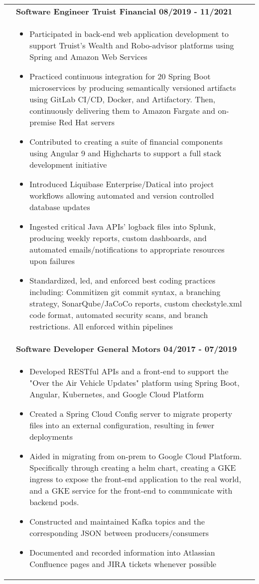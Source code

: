 \documentclass[final]{letter}
\begin{document}
\begin{tabularx}{\linewidth}{
		>{\raggedright\bf\Large} p{8.5em}X
		>{}X
	}
		
		& \quad\large\bf{Software Engineer \hfill {Truist Financial} \hfill 08/2019 - 11/2021} \\
		& \begin{itemize}[topsep=1pt,noitemsep]
			\item Participated in back-end web application development to support Truist's Wealth and Robo-advisor platforms using Spring and Amazon Web Services
			\item Practiced continuous integration for 20 Spring Boot microservices by producing semantically versioned artifacts using GitLab CI/CD, Docker, and Artifactory. Then, continuously delivering them to Amazon Fargate and on-premise Red Hat servers 
			\item Contributed to creating a suite of financial components using Angular 9 and Highcharts to support a full stack development initiative
			\item Introduced Liquibase Enterprise/Datical into project workflows allowing automated and version controlled database updates
			\item Ingested critical Java APIs' logback files into Splunk, producing weekly reports, custom dashboards, and automated emails/notifications to appropriate resources upon failures
			\item Standardized, led, and enforced best coding practices including: Commitizen git commit syntax, a branching strategy, SonarQube/JaCoCo reports, custom checkstyle.xml code format, automated security scans, and branch restrictions. All enforced within pipelines
		\end{itemize} \\
			
		& \large\bf{Software Developer \hfill {General Motors} \hfill 04/2017 - 07/2019} \\
		& \begin{itemize}[topsep=1pt,noitemsep]
			\item Developed RESTful APIs and a front-end to support the "Over the Air Vehicle Updates" platform using Spring Boot, Angular, Kubernetes, and Google Cloud Platform
			\item Created a Spring Cloud Config server to migrate property files into an external configuration, resulting in fewer deployments
			\item Aided in migrating from on-prem to Google Cloud Platform. Specifically through creating a helm chart, creating a GKE ingress to expose the front-end application to the real world, and a GKE service for the front-end to communicate with backend pods. 
			\item Constructed and maintained Kafka topics and the corresponding JSON between producers/consumers
			\item Documented and recorded information into Atlassian Confluence pages and JIRA tickets whenever possible
		\end{itemize} \\
	\end{tabularx} \\
\end{document}
